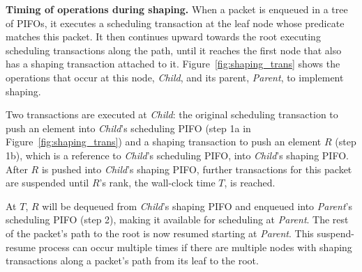 \medskip
\noindent
\textbf{Timing of operations during shaping.}
When a packet is enqueued in a tree of PIFOs, it executes a scheduling
transaction at the leaf node whose predicate matches this packet.  It
then continues upward towards the root executing scheduling
transactions along the path, until it reaches the first node that also
has a shaping transaction attached to
it. Figure~\ref{fig:shaping_trans} shows the operations that occur at
this node, {\em Child}, and its parent, {\em Parent}, to implement
shaping.

Two transactions are executed at {\em Child}: the original scheduling
transaction to push an element into {\em Child}'s scheduling PIFO (step 1a
in Figure~\ref{fig:shaping_trans}) and a shaping transaction to push an
element $R$ (step 1b), which is a reference to {\em Child}'s scheduling
PIFO, into {\em Child}'s shaping PIFO. After $R$ is pushed into {\em Child}'s
shaping PIFO, further transactions for this packet are suspended until
$R$'s rank, the wall-clock time $T$, is reached.

At $T$, $R$ will be dequeued from {\em Child}'s shaping PIFO and
enqueued into {\em Parent}'s scheduling PIFO (step 2), making it available
for scheduling at {\em Parent}. The rest of the packet's path to the root is now
resumed starting at {\em Parent}. This suspend-resume process can occur
multiple times if there are multiple nodes with shaping transactions
along a packet's path from its leaf to the root.
